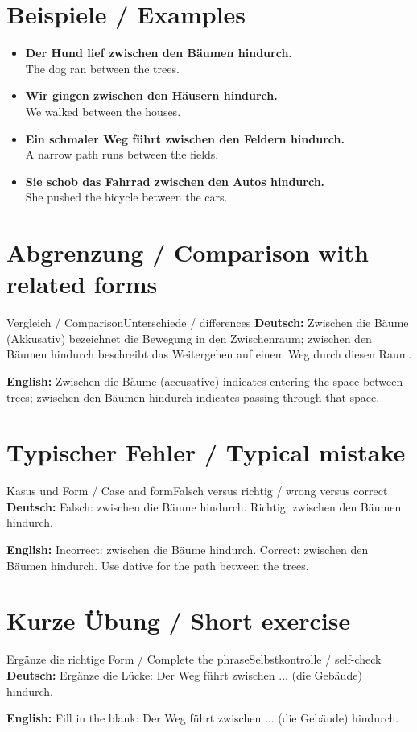 \documentclass[a4paper,11pt]{article}
\newcommand{\GermanText}[1]{\textbf{Deutsch: }#1\par}
\newcommand{\EnglishText}[1]{{\small\color{SoftGray}\textbf{English: }#1\par}}
\newcommand{\ExampleItem}[2]{\item \textbf{#1}\\{\small\color{SoftGray}#2}}
\begin{document}
\section{Beispiele / Examples}
\begin{exbox}
\begin{itemize}
\ExampleItem{Der Hund lief zwischen den Bäumen hindurch.}{The dog ran between the trees.}
\ExampleItem{Wir gingen zwischen den Häusern hindurch.}{We walked between the houses.}
\ExampleItem{Ein schmaler Weg führt zwischen den Feldern hindurch.}{A narrow path runs between the fields.}
\ExampleItem{Sie schob das Fahrrad zwischen den Autos hindurch.}{She pushed the bicycle between the cars.}
\end{itemize}
\end{exbox}
\section{Abgrenzung / Comparison with related forms}
\begin{grammarentry}{Vergleich / Comparison}{Unterschiede / differences}
\GermanText{Zwischen die Bäume (Akkusativ) bezeichnet die Bewegung in den Zwischenraum; zwischen den Bäumen hindurch beschreibt das Weitergehen auf einem Weg durch diesen Raum.}
\EnglishText{Zwischen die Bäume (accusative) indicates entering the space between trees; zwischen den Bäumen hindurch indicates passing through that space.}
\end{grammarentry}
\section{Typischer Fehler / Typical mistake}
\begin{grammarentry}{Kasus und Form / Case and form}{Falsch versus richtig / wrong versus correct}
\GermanText{Falsch: zwischen die Bäume hindurch. Richtig: zwischen den Bäumen hindurch.}
\EnglishText{Incorrect: zwischen die Bäume hindurch. Correct: zwischen den Bäumen hindurch. Use dative for the path between the trees.}
\end{grammarentry}
\section{Kurze Übung / Short exercise}
\begin{grammarentry}{Ergänze die richtige Form / Complete the phrase}{Selbstkontrolle / self-check}
\GermanText{Ergänze die Lücke: Der Weg führt zwischen ... (die Gebäude) hindurch.}
\EnglishText{Fill in the blank: Der Weg führt zwischen ... (die Gebäude) hindurch.}
\end{grammarentry}
\end{document}
